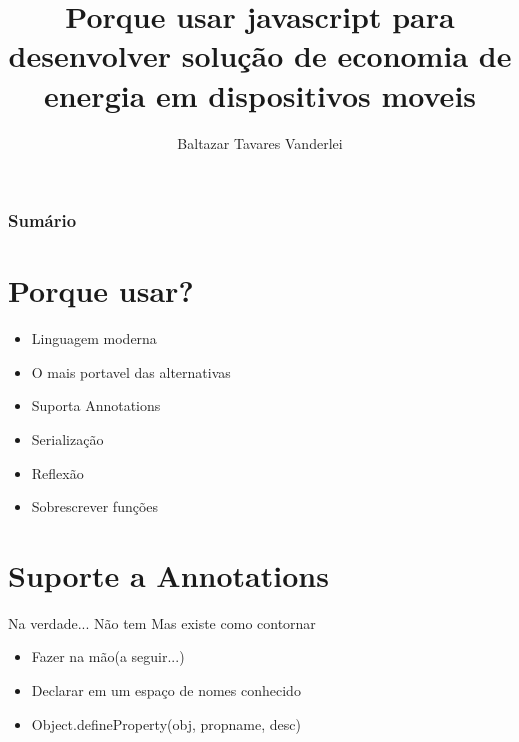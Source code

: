 \documentclass[10pt]{beamer}
\title[]{Porque usar javascript para desenvolver solução de economia de energia em dispositivos moveis}
\author[]{Baltazar Tavares Vanderlei}
\institute[2013]{Instituto de Computação - IC/UFAL}
\begin{document}
\newcommand{\til}{\~{}}

\frame{\titlepage}
	\begin{frame}[t]
	\frametitle{Sumário}
	\tableofcontents[framebreaks]
\end{frame}


\section{Porque usar?}

\begin{frame}
	\begin{itemize}%
		\item Linguagem moderna
		\item O mais portavel das alternativas
		\item Suporta Annotations
		\item Serialização
		\item Reflexão
		\item Sobrescrever funções
	\end{itemize}
\end{frame}

\section{Suporte a Annotations}
\begin{frame}
	\begin{alertblock}{Na verdade... Não tem}
		Mas existe como contornar
	\end{alertblock}
	\begin{itemize}%
		\item Fazer na mão(a seguir...)
		\item Declarar em um espaço de nomes conhecido
		\item Object.defineProperty(obj, propname, desc)
	\end{itemize}
\end{frame}
\end{document}
